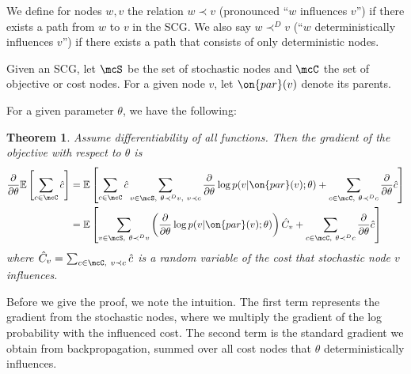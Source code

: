 \documentclass[12pt]{report}
\newtheorem{theorem}{Theorem}
\begin{document}
We define for nodes $w,v$ the relation $w \prec v$ (pronounced ``$w$ influences $v$'') if there exists a path from $w$ to $v$ in the SCG. We also say $w \prec^D v$ (``$w$ deterministically influences $v$'') if there exists a path that consists of only deterministic nodes.

Given an SCG, let $\mcS$ be the set of stochastic nodes and $\mcC$ the set of objective or cost nodes. For a given node $v$, let $\on{par}(v)$ denote its parents.

For a given parameter $\theta$, we have the following:
\begin{theorem}
Assume differentiability of all functions. Then the gradient of the objective with respect to $\theta$ is
\begin{align}
\frac{\partial}{\partial \theta} \mathbb{E}\left[ \sum_{c \in \mcC} \hat{c} \right] &= \mathbb{E}\left[\sum_{c \in \mcC} \hat{c} \sum_{v \in \mcS,~\theta \prec^D v, ~v \prec c }  \frac{\partial}{\partial\theta} \log p(v | \on{par}(v) ; \theta )  +
 \sum_{c\in \mcC,~\theta \prec^D c} \frac{\partial}{\partial \theta} \hat{c}
\right] \label{eq:gradient1} \\
&=  \mathbb{E}\left[ \sum_{v \in \mcS,~\theta \prec^D v} \left( \frac{\partial}{\partial\theta} \log p(v | \on{par}(v) ; \theta ) \right) \hat{C}_v + \sum_{c\in \mcC,~\theta \prec^D c} \frac{\partial}{\partial \theta} \hat{c} \label{eq:gradient2}
\right] 
\end{align}
where $\hat{C}_v = \sum_{c \in \mcC, ~v \prec c} \hat{c}$ is a random variable of the cost that stochastic node $v$ influences.
\label{thm:gradient}
\end{theorem}
Before we give the proof, we note the intuition. The first term represents the gradient from the stochastic nodes, where we multiply the gradient of the log probability with the influenced cost.
The second term is the standard gradient we obtain from backpropagation, summed over all cost nodes that $\theta$ deterministically influences.
\end{document}
